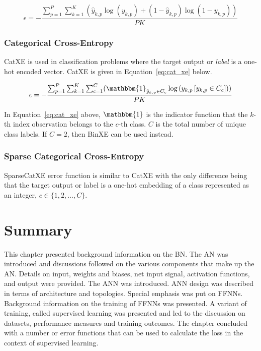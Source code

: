 \begin{equation}
    \epsilon = -\frac{\sum_{p=1}^P \sum_{k=1}^K (\hat{y}_{k,p} \log{(y_{k,p})} + (1 - \hat{y}_{k,p})\log{(1 - y_{k,p})})}{PK}
    \label{eq:bin_xe}
\end{equation}

\noindent

\subsubsection{Categorical Cross-Entropy}\label{sec:anns:training:error_functions:cat_xe}

\acs{CatXE} is used in classification problems where the target output or \textit{label} is a one-hot encoded vector. \acs{CatXE} is given in Equation~\eqref{eq:cat_xe} below.

\begin{equation}
    \epsilon = -\frac{\sum_{p=1}^P \sum_{k=1}^K \sum_{c=1}^C (\mathbbm{1}_{\hat{y}_{k,p} \in C_c} \log{(y_{k,p} \left[ y_{k,p} \in C_c \right])})}{PK}
    \label{eq:cat_xe}
\end{equation}

\noindent
In Equation~\eqref{eq:cat_xe} above, $\mathbbm{1}$ is the indicator function that the $k$-th index observation belongs to the $c$-th class. $C$ is the total number of unique class labels. If $C = 2$, then \acs{BinXE} can be used instead.

\subsubsection{Sparse Categorical Cross-Entropy}\label{sec:anns:training:error_functions:sparse_cat_xe}

\acs{SparseCatXE} error function is similar to \acs{CatXE} with the only difference being that the target output or label is a one-hot embedding of a class represented as an integer, $c \in \{1,2, \dots, C\}$.


\section{Summary}\label{sec:anns:summary}

This chapter presented background information on the \acs{BN}. The \acs{AN} was introduced and discussions followed on the various components that make up the \acs{AN}. Details on input, weights and biases, net input signal, activation functions, and output were provided. The \acs{ANN} was introduced. \acs{ANN} design was described in terms of architecture and topologies. Special emphasis was put on \acp{FFNN}. Background information on the training of \acp{FFNN} was presented. A variant of training, called supervised learning was presented and led to the discussion on datasets, performance measures and training outcomes. The chapter concluded with a number or error functions that can be used to calculate the loss in the context of supervised learning.
